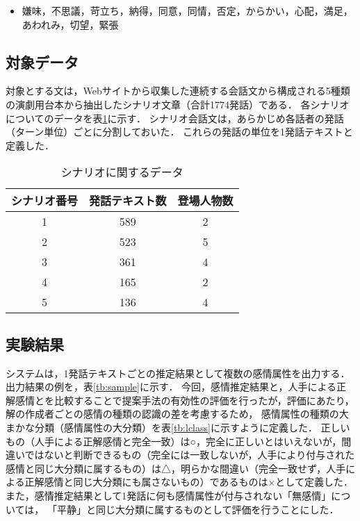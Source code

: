 \documentclass[japanese]{jnlp_1.3c}
\begin{document}
\begin{itemize}
\item 嫌味，不思議，苛立ち，納得，同意，同情，否定，からかい，心配，満足，
あわれみ，切望，緊張 
\end{itemize}


\subsection{対象データ}

対象とする文は，Webサイトから収集した連続する会話文から構成される5種類の演劇用台本から抽出したシナリオ文章（合計1774発話）である．
各シナリオについてのデータを表\ref{tb:scenario-info}に示す．
シナリオ会話文は，あらかじめ各話者の発話（ターン単位）ごとに分割しておいた．
これらの発話の単位を1発話テキストと定義した．

\begin{table}[b]
\begin{center}
\caption{シナリオに関するデータ}
\begin{tabular}{|c|c|c|}
\hline
シナリオ番号	&	発話テキスト数	&	登場人物数	\\ \hline \hline
1	&	589	&	2 \\ \hline
2	&	523	&	5 \\ \hline
3	&	361	&	4 \\ \hline
4	&	165	&	2 \\ \hline
5	&	136	&	4 \\ \hline
\end{tabular}
\label{tb:scenario-info}
\end{center}
\end{table}


\subsection{実験結果}

システムは，1発話テキストごとの推定結果として複数の感情属性を出力する．
出力結果の例を，表\ref{tb:sample}に示す．
今回，感情推定結果と，人手による正解感情とを比較することで提案手法の有効性の評価を行ったが，評価にあたり，解の作成者ごとの感情の種類の認識の差を考慮するため，
感情属性の種類の大まかな分類（感情属性の大分類）を表\ref{tb:lclass}に示すように定義した．
正しいもの（人手による正解感情と完全一致）は○，完全に正しいとはいえないが，間違いではないと判断できるもの（完全には一致しないが，人手により付与された感情と同じ大分類に属するもの）は△，明らかな間違い（完全一致せず，人手による正解感情と同じ大分類にも属さないもの）であるものは×として定義した．
また，感情推定結果として1発話に何も感情属性が付与されない「無感情」については，
「平静」と同じ大分類に属するものとして評価を行うことにした．
\end{document}
